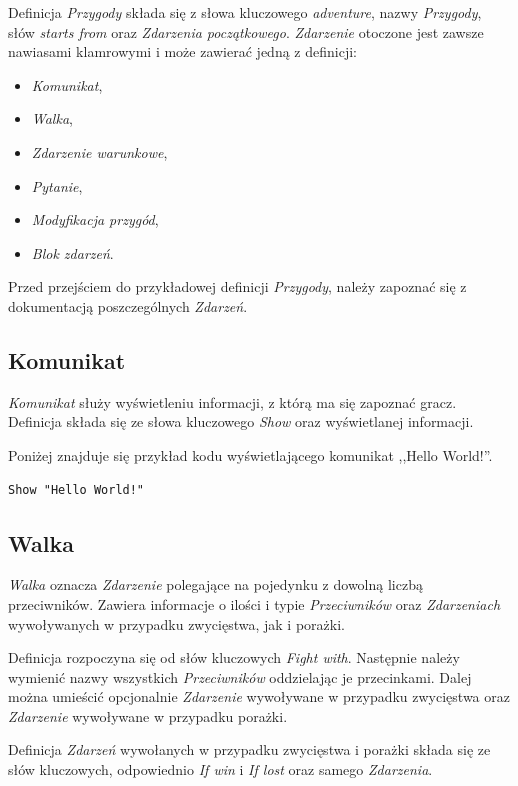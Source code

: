 \documentclass[openright]{xmgr}
\begin{document}
Definicja \textit{Przygody} składa się z słowa kluczowego \textit{adventure}, nazwy \textit{Przygody}, słów \textit{starts from} oraz \textit{Zdarzenia początkowego}. \textit{Zdarzenie} otoczone jest zawsze nawiasami klamrowymi i może zawierać jedną z definicji:
\begin{itemize}
	\item \textit{Komunikat},
	\item \textit{Walka},
	\item \textit{Zdarzenie warunkowe},
	\item \textit{Pytanie},
	\item \textit{Modyfikacja przygód},
	\item \textit{Blok zdarzeń}.
\end{itemize}

Przed przejściem do przykładowej definicji \textit{Przygody}, należy zapoznać się z dokumentacją poszczególnych \textit{Zdarzeń}.
\subsection*{Komunikat}
\textit{Komunikat} służy wyświetleniu informacji, z którą ma się zapoznać gracz. Definicja składa się ze słowa kluczowego \textit{Show} oraz wyświetlanej informacji.

Poniżej znajduje się przykład kodu wyświetlającego komunikat ,,Hello World!''.
\begin{verbatim}
Show "Hello World!"
\end{verbatim}

\subsection*{Walka}
\textit{Walka} oznacza \textit{Zdarzenie} polegające na pojedynku z dowolną liczbą przeciwników. Zawiera informacje o ilości i typie \textit{Przeciwników} oraz \textit{Zdarzeniach} wywoływanych w przypadku zwycięstwa, jak i porażki.

Definicja rozpoczyna się od słów kluczowych \textit{Fight with}. Następnie należy wymienić nazwy wszystkich \textit{Przeciwników} oddzielając je przecinkami. Dalej można umieścić opcjonalnie \textit{Zdarzenie} wywoływane w przypadku zwycięstwa oraz \textit{Zdarzenie} wywoływane w przypadku porażki.

Definicja \textit{Zdarzeń} wywołanych w przypadku zwycięstwa i porażki składa się ze słów kluczowych, odpowiednio \textit{If win} i \textit{If lost} oraz samego \textit{Zdarzenia}.
\end{document}
